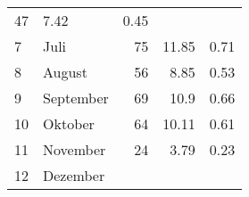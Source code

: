 \begin{longtable}{lXrrr}
       \num{47} &
       \num[round-mode=places,round-precision=2]{7.42} &
         \num[round-mode=places,round-precision=2]{0.45} \\

     7 &
     \multicolumn{1}{X}{ Juli   } &


       \num{75} &
       \num[round-mode=places,round-precision=2]{11.85} &
         \num[round-mode=places,round-precision=2]{0.71} \\

     8 &
     \multicolumn{1}{X}{ August   } &


       \num{56} &
       \num[round-mode=places,round-precision=2]{8.85} &
         \num[round-mode=places,round-precision=2]{0.53} \\

     9 &
     \multicolumn{1}{X}{ September   } &


       \num{69} &
       \num[round-mode=places,round-precision=2]{10.9} &
         \num[round-mode=places,round-precision=2]{0.66} \\

     10 &
     \multicolumn{1}{X}{ Oktober   } &


       \num{64} &
       \num[round-mode=places,round-precision=2]{10.11} &
         \num[round-mode=places,round-precision=2]{0.61} \\

     11 &
     \multicolumn{1}{X}{ November   } &


       \num{24} &
       \num[round-mode=places,round-precision=2]{3.79} &
         \num[round-mode=places,round-precision=2]{0.23} \\

     12 &
     \multicolumn{1}{X}{ Dezember   } &



\end{longtable}

